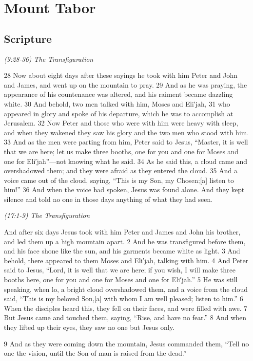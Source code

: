 \documentclass[letterpaper]{report}
\begin{document}
\clearpage
\section{Mount Tabor}
\begin{multicols}{2}
	\mbox{}
\end{multicols}
\subsection{Scripture}

{\centering
	\emph{(9:28-36) The Transfiguration}\\
}
\begin{multicols}{2}
28 Now about eight days after these sayings he took with him Peter and John and James, and went up on the mountain to pray. 29 And as he was praying, the appearance of his countenance was altered, and his raiment became dazzling white. 30 And behold, two men talked with him, Moses and Eli′jah, 31 who appeared in glory and spoke of his departure, which he was to accomplish at Jerusalem. 32 Now Peter and those who were with him were heavy with sleep, and when they wakened they saw his glory and the two men who stood with him. 33 And as the men were parting from him, Peter said to Jesus, “Master, it is well that we are here; let us make three booths, one for you and one for Moses and one for Eli′jah”—not knowing what he said. 34 As he said this, a cloud came and overshadowed them; and they were afraid as they entered the cloud. 35 And a voice came out of the cloud, saying, “This is my Son, my Chosen;[a] listen to him!” 36 And when the voice had spoken, Jesus was found alone. And they kept silence and told no one in those days anything of what they had seen.
\end{multicols}

{\centering
	\emph{(17:1-9) The Transfiguration}\\
}
\begin{multicols}{2}
And after six days Jesus took with him Peter and James and John his brother, and led them up a high mountain apart. 2 And he was transfigured before them, and his face shone like the sun, and his garments became white as light. 3 And behold, there appeared to them Moses and Eli′jah, talking with him. 4 And Peter said to Jesus, “Lord, it is well that we are here; if you wish, I will make three booths here, one for you and one for Moses and one for Eli′jah.” 5 He was still speaking, when lo, a bright cloud overshadowed them, and a voice from the cloud said, “This is my beloved Son,[a] with whom I am well pleased; listen to him.” 6 When the disciples heard this, they fell on their faces, and were filled with awe. 7 But Jesus came and touched them, saying, “Rise, and have no fear.” 8 And when they lifted up their eyes, they saw no one but Jesus only.

9 And as they were coming down the mountain, Jesus commanded them, “Tell no one the vision, until the Son of man is raised from the dead.”
\end{multicols}
\end{document}

